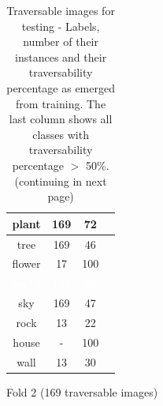 \documentclass[12pt,a4paper,table,dvipsnames,tikz]{report}
\newcommand{\white}[1]{\textbf{\textcolor{white}{#1}}} %
\begin{document}
\begin{table}[h!]
\begin{subtable}[h!]{\textwidth}
\begin{tabular}{|c|c|c|c|}
				\hline
				plant & 169 & 72 & \checkmark\\
				\hline
				\rowcolor{tree}
				tree & 169 & 46 &\\
				\hline
				flower & 17 & 100 & \checkmark\\
				\hline
				\rowcolor{earth}
				\white{earth} & \white{169} & \white{46} &\\
				\hline
				\rowcolor{sky}
				sky & 169 & 47 &\\
				\hline
				rock & 13 & 22 &\\
				\hline
				\rowcolor{house}
				house & - & 100 & \checkmark\\
				\hline
				wall & 13 & 30 &\\
				\hline
			\end{tabular}
			\caption{Fold 2 (169 traversable images)}
			\label{table:trav.f2}
		\end{subtable}
		\caption{Traversable images for testing - Labels, number of their instances and their 
			traversability percentage as emerged from training. The last column shows all 
			classes with traversability percentage $>$ 50\%. (continuing in next page)}
		\label{table:trav.folds}
	\end{table}
	
\end{document}
